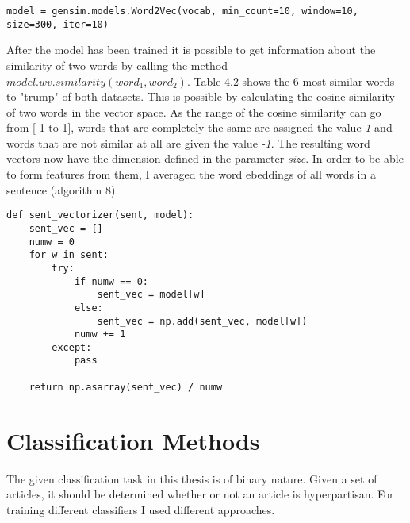 \documentclass[a4paper, 11pt,titlepage,oneside,openany]{book}
\begin{document}
 \begin{lstlisting}[caption=Word2Vec with gensim]
 model = gensim.models.Word2Vec(vocab, min_count=10, window=10, size=300, iter=10)
 \end{lstlisting}
\indent 
After the model has been trained it is possible to get information about the similarity of two words by calling the method $model.wv.similarity(word_1, word_2)$. Table 4.2 shows the 6 most similar words to "trump" of both datasets. This is possible by calculating the cosine similarity of two words in the vector space. As the range of the cosine similarity can go from [-1 to 1], words that are completely the same are assigned the value \textit{1} and words that are not similar at all are given the value \textit{-1}. 
\newpage
\indent The resulting word vectors now have the dimension defined in the parameter \textit{size}. In order to be able to form features from them, I averaged the word ebeddings of all words in a sentence (algorithm 8).
\begin{lstlisting}[caption=sent\_vectorizer]
def sent_vectorizer(sent, model):
    sent_vec = []
    numw = 0
    for w in sent:
        try:
            if numw == 0:
                sent_vec = model[w]
            else:
                sent_vec = np.add(sent_vec, model[w])
            numw += 1
        except:
            pass

    return np.asarray(sent_vec) / numw
\end{lstlisting}

\section{Classification Methods}
The given classification task in this thesis is of binary nature. Given a set of articles, it should be determined whether or not an article is hyperpartisan. For training different classifiers I used different approaches. \\
\end{document}
